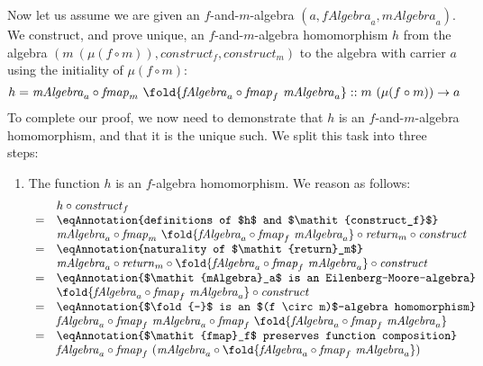\begin{proof*}
  Now let us assume we are given an $f$-and-$m$-algebra $(a,
  \mathit{fAlgebra}_a, \mathit{mAlgebra}_a)$. We construct, and prove
  unique, an $f$-and-$m$-algebra homomorphism $h$ from the algebra
  $(m~(\mu(f \circ m)), \mathit{construct}_f, \mathit{construct}_m)$
  to the algebra with carrier $a$ using the initiality of $\mu(f \circ
  m)$:
  \begin{displaymath}
    h = \mathit{mAlgebra}_a \circ \mathit{fmap}_m~\fold{\mathit{fAlgebra}_a \circ \mathit{fmap}_f~\mathit{mAlgebra}_a} :: m~(\mu(f \circ m)) \to a
  \end{displaymath}
  To complete our proof, we now need to demonstrate that $h$ is an
  $f$-and-$m$-algebra homomorphism, and that it is the unique such. We
  split this task into three steps:
  \begin{enumerate}
  \item The function $h$ is an $f$-algebra homomorphism. We reason as
    follows:
    \begin{displaymath}
      \begin{array}{cl}
        & h \circ \mathit{construct}_f \\
        =&\eqAnnotation{definitions of $h$ and $\mathit{construct_f}$} \\
         &\mathit{mAlgebra}_a \circ \mathit{fmap}_m~\fold{\mathit{fAlgebra}_a \circ \mathit{fmap}_f~\mathit{mAlgebra}_a} \circ \mathit{return}_m \circ \mathit{construct} \\
        =&\eqAnnotation{naturality of $\mathit{return}_m$} \\
         &\mathit{mAlgebra}_a \circ \mathit{return}_m \circ \fold{\mathit{fAlgebra}_a \circ \mathit{fmap}_f~\mathit{mAlgebra}_a} \circ \mathit{construct} \\
        =&\eqAnnotation{$\mathit{mAlgebra}_a$ is an Eilenberg-Moore-algebra} \\
         &\fold{\mathit{fAlgebra}_a \circ \mathit{fmap}_f~\mathit{mAlgebra}_a} \circ \mathit{construct} \\
        =&\eqAnnotation{$\fold{-}$ is an $(f \circ m)$-algebra homomorphism} \\
         &\mathit{fAlgebra}_a \circ \mathit{fmap}_f~\mathit{mAlgebra}_a \circ \mathit{fmap}_f~\fold{\mathit{fAlgebra}_a \circ \mathit{fmap}_f~\mathit{mAlgebra}_a} \\
        =&\eqAnnotation{$\mathit{fmap}_f$ preserves function composition} \\
         &\mathit{fAlgebra}_a \circ \mathit{fmap}_f~(\mathit{mAlgebra}_a \circ \fold{\mathit{fAlgebra}_a \circ \mathit{fmap}_f~\mathit{mAlgebra}_a}) \\

\end{array}
\end{displaymath}
\end{enumerate}
\end{proof*}
